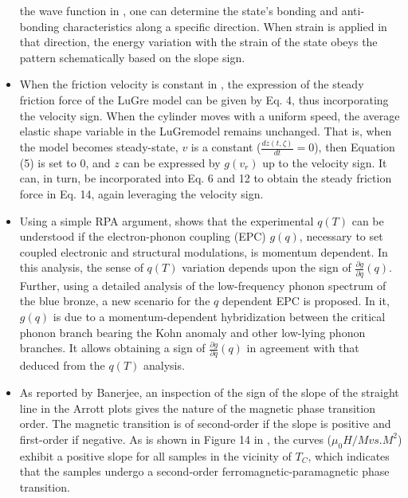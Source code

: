 \documentclass[11pt]{book}
\begin{document}
\begin{itemize}
the wave function in \cite{wei2020auxetic},
one can determine the state's bonding and anti-bonding characteristics
along a specific direction. When strain is applied in that direction,
the energy variation with the strain of the state obeys the pattern
schematically based on the slope sign.
\item When the friction velocity is constant in \cite{wu2020influence},
the expression of the steady friction force of the LuGre model can
be given by Eq. 4, thus incorporating the velocity sign. When the
cylinder moves with a uniform speed, the average elastic shape variable
in the LuGremodel remains unchanged. That is, when the model becomes
steady-state, $v$ is a constant ($\frac{dz\left(t,\zeta\right)}{dt}=0$),
then Equation (5) is set to $0$, and $z$ can be expressed by $g\left(v_{r}\right)$
up to the velocity sign. It can, in turn, be incorporated into Eq.
6 and 12 to obtain the steady friction force in Eq. 14, again leveraging
the velocity sign.
\item Using a simple RPA argument, \cite{pouget2021momentum}
shows that the experimental $q\left(T\right)$ can be understood if
the electron-phonon coupling (EPC) $g\left(q\right)$, necessary to
set coupled electronic and structural modulations, is momentum dependent.
In this analysis, the sense of $q\left(T\right)$ variation depends
upon the sign of $\frac{\partial g}{\partial q}\left(q\right)$. Further,
using a detailed analysis of the low-frequency phonon spectrum of
the blue bronze, a new scenario for the $q$ dependent EPC is proposed.
In it, $g\left(q\right)$ is due to a momentum-dependent hybridization
between the critical phonon branch bearing the Kohn anomaly and other
low-lying phonon branches. It allows obtaining a sign of $\frac{\partial g}{\partial q}\left(q\right)$
in agreement with that deduced from the $q\left(T\right)$ analysis.
\item As reported by Banerjee, an inspection of the sign of the slope of
the straight line in the Arrott plots gives the nature of the magnetic
phase transition order. The magnetic transition is of second-order
if the slope is positive and first-order if negative. As is shown
in Figure 14 in \cite{saidi2021effect},
the curves ($\mu_{0}H/Mvs.M^{2}$) exhibit a positive slope for all
samples in the vicinity of $T_{C}$, which indicates that the samples
undergo a second-order ferromagnetic-paramagnetic phase transition.
\end{itemize}

\end{document}
